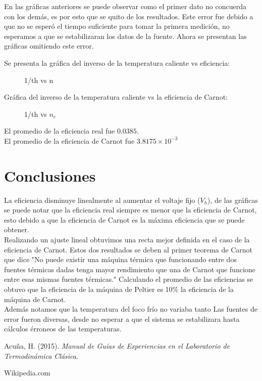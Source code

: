 \documentclass[12pt]{article}
\begin{document}
En las gráficas anteriores se puede observar como el primer dato no concuerda con los demás, es por esto que se quito de los resultados.
Este error fue debido a que no se esperó el tiempo suficiente para tomar la primera medición, no esperamos a que se estabilizaran los datos de la fuente.
Ahora se presentan las gráficas omitiendo este error.


Se presenta la gráfica del inverso de la temperatura caliente vs eficiencia:

\begin{figure}[H]
\begin{center}
\caption{1/th vs n}
\label{one}
\end{center}
\end{figure}

Gráfica del inverso de la temperatura caliente vs la eficiencia de Carnot:

\begin{figure}[H]
\begin{center}
\caption{1/th vs $n_c$}
\label{one}
\end{center}
\end{figure}

El promedio de la eficiencia real fue $0.0385$. \\
El promedio de la eficiencia de Carnot fue $3.8175 \times 10^{-3}$
\section{Conclusiones}
La eficiencia disminuye linealmente al aumentar el voltaje fijo ($V_h$), de las gráficas se puede notar que la eficiencia real siempre es menor que la eficiencia de Carnot, esto debido a que la eficiencia de Carnot es la máxima eficiencia que se puede obtener. \\
Realizando un ajuste lineal obtuvimos una recta mejor definida en el caso de la eficiencia de Carnot.
Estos dos resultados se deben al primer teorema de Carnot que dice "No puede existir una máquina térmica que funcionando entre dos fuentes térmicas dadas tenga mayor rendimiento que una de Carnot que funcione entre esas mismas fuentes térmicas." \cite{W}
Calculando el promedio de las eficiencias se obtuvo que la eficiencia de la máquina de Peltier es 10$\%$ la eficiencia de la máquina de Carnot.\\
Además notamos que la temperatura del foco frío no variaba tanto
Las fuentes de error fueron diversas, desde no esperar a que el sistema se estabilizara hasta cálculos érroneos de las temperaturas.


\begin{thebibliography}{6}


Acu\~na, H. (2015). \textit{Manual de Guías de Experiencias en el Laboratorio de Termodinámica Clásica}.

Wikipedia.com


\end{thebibliography}
\end{document}
